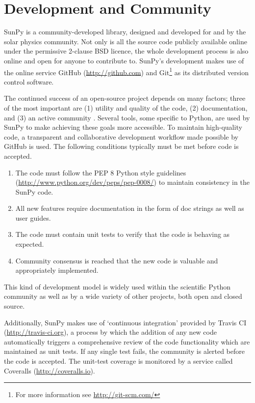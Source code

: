 \section{Development and Community}\label{sec:dev}
SunPy is a community-developed library, designed and developed for and by 
the solar physics community. Not only is all the source code publicly available 
online under the permissive 2-clause BSD licence, the whole 
development process is also online and open for anyone to contribute to.
SunPy's development makes use of the online service 
GitHub (\url{http://github.com}) and Git\footnote{For more information see \url{http://git-scm.com/}}
as its distributed version control software. 

The continued success of an open-source project depends on many factors;
three of the most important are (1) utility and quality of the code, (2) documentation, and (3) an
active community \citep{bangerth2013}. Several tools, some specific to Python, are used by
SunPy to make achieving these goals more accessible. To maintain high-quality code, a 
transparent and collaborative development workflow made possible by GitHub is used.
The following conditions typically must be met before code is accepted.
\begin{enumerate}
	\item  The code must follow the
	PEP 8 Python style 
	guidelines (\url{http://www.python.org/dev/peps/pep-0008/}) to maintain consistency in the SunPy code.
	
	\item All new features require documentation in the form of doc strings as well as user
	guides. 
	
	\item The code must contain unit tests to verify that the code is behaving 
	as expected.

    \item Community consensus is reached that the new code is valuable and appropriately implemented.
\end{enumerate}
This kind of development model is widely used within the scientific Python 
community as well as by a wide variety of other projects, both open and closed 
source. 

Additionally, SunPy makes use of `continuous integration' provided by Travis CI (\url{http://travis-ci.org}), a process by which the addition of any new code 
automatically triggers a comprehensive review of the code functionality which are maintained as unit tests.
 If any single test
fails, the community is alerted before the code is accepted. The unit-test coverage is monitored by
a service called Coveralls (\url{http://coveralls.io}).

